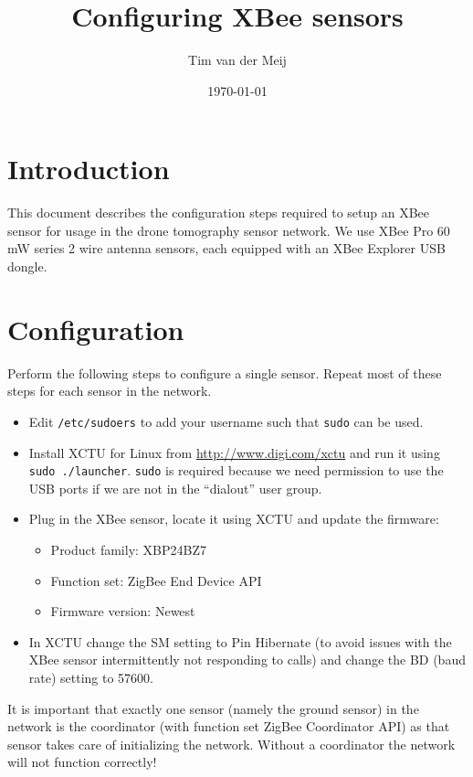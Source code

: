 \documentclass{article}
\begin{document}
\title{Configuring XBee sensors}
\author{Tim van der Meij}
\date{\today}

\maketitle

\section{Introduction}
This document describes the configuration steps required to setup an XBee sensor
for usage in the drone tomography sensor network. We use XBee Pro 60 mW series 2
wire antenna sensors, each equipped with an XBee Explorer USB dongle.

\section{Configuration}
Perform the following steps to configure a single sensor. Repeat most of these
steps for each sensor in the network.

\begin{itemize}
    \item Edit {\tt /etc/sudoers} to add your username such that {\tt sudo} can
          be used.
    \item Install XCTU for Linux from \url{http://www.digi.com/xctu} and run it
          using {\tt sudo~./launcher}. {\tt sudo} is required because we need
          permission to use the USB ports if we are not in the ``dialout'' user
          group.
    \item Plug in the XBee sensor, locate it using XCTU and update the firmware:
          \begin{itemize}
              \item Product family: XBP24BZ7
              \item Function set: ZigBee End Device API
              \item Firmware version: Newest
          \end{itemize}
    \item In XCTU change the SM setting to Pin Hibernate (to avoid issues with
          the XBee sensor intermittently not responding to calls) and change the
          BD (baud rate) setting to 57600.
\end{itemize}

It is important that exactly one sensor (namely the ground sensor) in the network
is the coordinator (with function set ZigBee Coordinator API) as that sensor
takes care of initializing the network. Without a coordinator the network will
not function correctly!
\end{document}
